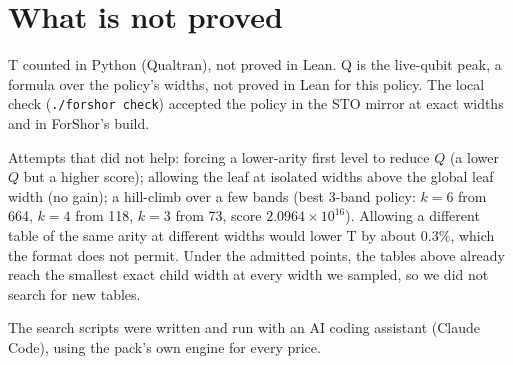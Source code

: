 \documentclass[11pt]{article}
\begin{document}
\section*{What is not proved}
T counted in Python (Qualtran), not proved in Lean. Q is the live-qubit peak, a formula over the policy's widths, not proved in Lean for this policy. The local check (\texttt{./forshor check}) accepted the policy in the STO mirror at exact widths and in ForShor's build.

Attempts that did not help: forcing a lower-arity first level to reduce $Q$ (a lower $Q$ but a higher score); allowing the leaf at isolated widths above the global leaf width (no gain); a hill-climb over a few bands (best 3-band policy: $k=6$ from 664, $k=4$ from 118, $k=3$ from 73, score $2.0964 \times 10^{16}$). Allowing a different table of the same arity at different widths would lower T by about 0.3\%, which the format does not permit. Under the admitted points, the tables above already reach the smallest exact child width at every width we sampled, so we did not search for new tables.

The search scripts were written and run with an AI coding assistant (Claude Code), using the pack's own engine for every price.
\end{document}
